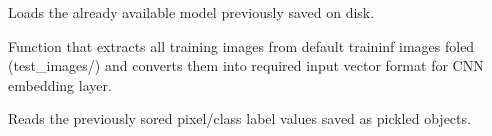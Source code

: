 \documentclass[letterpaper,10pt,english]{sphinxmanual}
\begin{document}

\begin{fulllineitems}
\label{\detokenize{basefunctions:basefunctions.load_model}}
Loads the already available model previously saved on disk.

\end{fulllineitems}


\begin{fulllineitems}
\label{\detokenize{basefunctions:basefunctions.processInputTrain}}
Function that extracts all training images from default traininf images foled (test\_images/) and converts them into required input vector format for CNN embedding layer.

\end{fulllineitems}


\begin{fulllineitems}
\label{\detokenize{basefunctions:basefunctions.readFromDisk}}
Reads the previously sored pixel/class label values saved as pickled objects.

\end{fulllineitems}

\end{document}
